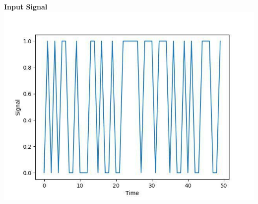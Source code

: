 \documentclass[a4paper,10pt]{article}
\begin{document}
\begin{center}
\vspace*{1cm}
\large{\textbf{Input Signal}}\\
\includegraphics[width=15cm, height=10cm]{fig1}\\


\end{center}
\end{document}
